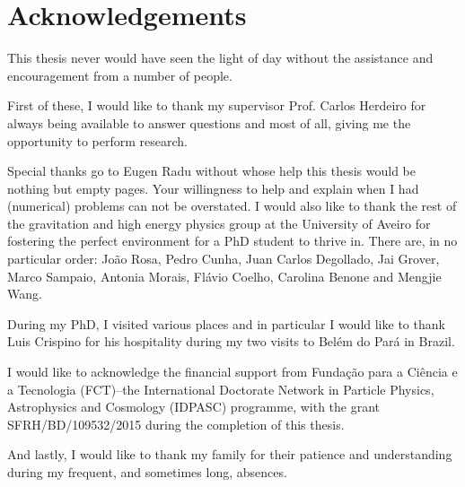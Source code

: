 \chapter*{Acknowledgements}

This thesis never would have seen the light of day without the assistance and encouragement from a number of people.

First of these, I would like to thank my supervisor Prof. Carlos Herdeiro for always being available to answer questions and most of all, giving me the opportunity to perform research.

Special thanks go to Eugen Radu without whose help this thesis would be nothing but empty pages.
Your willingness to help and explain when I had (numerical) problems can not be overstated.
I would also like to thank the rest of the gravitation and high energy physics group at the University of Aveiro for fostering the perfect environment for a PhD student to thrive in.
There are, in no particular order: Jo\~ao Rosa, Pedro Cunha, Juan Carlos Degollado, Jai Grover, Marco Sampaio, Antonia Morais, Fl\'avio Coelho, Carolina Benone and Mengjie Wang.

During my PhD, I visited various places and in particular I would like to thank Luis Crispino for his hospitality during my two visits to Bel\'em do Par\'a in Brazil.

I would like to acknowledge the financial support from Funda\c{c}\~ao para a Ci\^encia e a Tecnologia (FCT)--the International Doctorate Network in Particle Physics, Astrophysics and Cosmology (IDPASC) programme, with the grant SFRH/BD/109532/2015 during the completion of this thesis.

And lastly, I would like to thank my family for their patience and understanding during my frequent, and sometimes long, absences.
